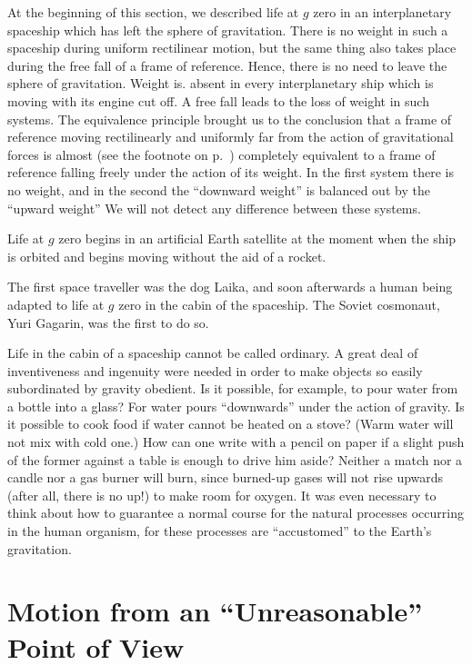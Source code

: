At the beginning of this section, we described life at
$g$ zero in an interplanetary spaceship which has left the
sphere of gravitation. There is no weight in such a spaceship during uniform rectilinear motion, but the same thing also takes place during the free fall of a frame of reference. Hence, there is no need to leave the sphere of gravitation. Weight is. absent in every interplanetary
ship which is moving with its engine cut off. A free
fall leads to the loss of weight in such systems. The equivalence principle brought us to the conclusion that a
frame of reference moving rectilinearly and uniformly
far from the action of gravitational forces is almost (see
the footnote on p.~\pageref{eqpr}) completely equivalent to a frame
of reference falling freely under the action of its weight.
In the first system there is no weight, and in the second
the ``downward weight'' is balanced out by the ``upward weight'' We will not detect any difference between these systems.

Life at $g$ zero begins in an artificial Earth satellite at the moment when the ship is orbited and begins moving without the aid of a rocket.

The first space traveller was the dog Laika, and soon afterwards a human being adapted to life at $g$ zero in the cabin of the spaceship. The Soviet cosmonaut, Yuri Gagarin, was the first to do so.

Life in the cabin of a spaceship cannot be called ordinary. A great deal of inventiveness and ingenuity were
needed in order to make objects so easily subordinated
by gravity obedient. Is it possible, for example, to pour
water from a bottle into a glass? For water pours ``downwards'' under the action of gravity. Is it possible to cook
food if water cannot be heated on a stove? (Warm water
will not mix with cold one.) How can one write with
a pencil on paper if a slight push of the former against
a table is enough to drive him aside? Neither a match
nor a candle nor a gas burner will burn, since burned-up
gases will not rise upwards (after all, there is no up!) to
make room for oxygen. It was even necessary to think
about how to guarantee a normal course for the natural
processes occurring in the human organism, for these
processes are ``accustomed'' to the Earth's gravitation.


\section{Motion from an ``Unreasonable'' Point of View}

